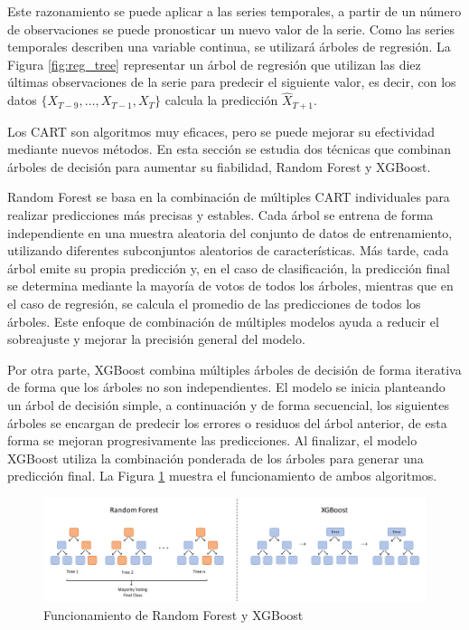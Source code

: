 \documentclass[12pt,twoside]{article}
\begin{document}
Este razonamiento se puede aplicar a las series temporales, a partir de un número de observaciones se puede pronosticar un nuevo valor de la serie. Como las series temporales describen una variable continua, se utilizará árboles de regresión. La Figura \ref{fig:reg_tree} representar un árbol de regresión que utilizan las diez últimas observaciones de la serie para predecir el siguiente valor, es decir, con los datos $\{X_{T-9}, \dotsc, X_{T-1}, X_T\}$ calcula la predicción $\hat{X}_{T+1}$.


Los CART son algoritmos muy eficaces, pero se puede mejorar su efectividad mediante nuevos métodos. En esta sección se estudia dos técnicas que combinan árboles de decisión para aumentar su fiabilidad, Random Forest y XGBoost.


Random Forest se basa en la combinación de múltiples CART individuales para realizar predicciones más precisas y estables. Cada árbol  se entrena de forma independiente en una muestra aleatoria del conjunto de datos de entrenamiento, utilizando diferentes subconjuntos aleatorios de características. Más tarde, cada árbol emite su propia predicción y, en el caso de clasificación, la predicción final se determina mediante la mayoría de votos de todos los árboles, mientras que en el caso de regresión, se calcula el promedio de las predicciones de todos los árboles. Este enfoque de combinación de múltiples modelos ayuda a reducir el sobreajuste y mejorar la precisión general del modelo. 


Por otra parte, XGBoost combina múltiples árboles de decisión de forma iterativa de forma que los árboles no son independientes. El modelo se inicia planteando un árbol de decisión simple, a continuación y de forma secuencial, los siguientes árboles se encargan de predecir los errores o residuos del árbol anterior, de esta forma se mejoran progresivamente las predicciones. Al finalizar, el modelo XGBoost utiliza la combinación ponderada de los árboles para generar una predicción final. La Figura \ref{fig:RF+XGB} muestra el funcionamiento de ambos algoritmos.


\begin{figure}[h]
\centering
    \includegraphics[width = \textwidth]{imagenes/RF+XGB.png}
    \caption{Funcionamiento de Random Forest y XGBoost}\label{fig:RF+XGB}
\end{figure}
\end{document}
